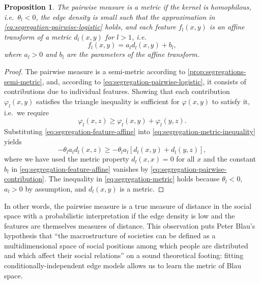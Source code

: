 \documentclass{scrartcl}
\newtheorem{prop}{Proposition}
\begin{document}
\begin{prop}
    The pairwise measure is a metric if the kernel is homophilous, i.e.\ $\theta_l<0$, the edge density is small such that the approximation in \cref{eq:segregation-pairwise-logistic} holds, and each feature $f_l(x, y)$ is an affine transform of a metric $d_l(x, y)$ for $l>1$, i.e.
    \begin{equation}
        f_l(x, y) = a_l d_l(x, y) + b_l,\label{eq:segregation-feature-affine}
    \end{equation}
    where $a_l > 0$ and $b_l$ are the parameters of the affine transform.
\end{prop}
\begin{proof}
    The pairwise measure is a semi-metric according to \cref{prop:segregations-semi-metric}, and, according to \cref{eq:segregation-pairwise-logistic}, it consists of contributions due to individual features. Showing that each contribution $\varphi_l(x, y)$ satisfies the triangle inequality is sufficient for $\varphi(x, y)$ to satisfy it, i.e.\ we require
    \begin{equation}
        \varphi_l(x, z) \geq \varphi_l(x, y) + \varphi_l(y, z).\label{eq:segregation-metric-inequality}
    \end{equation}
    Substituting \cref{eq:segregation-feature-affine} into \cref{eq:segregation-metric-inequality} yields
    \begin{equation}
        -\theta_l a_l d_l(x, z)\geq -\theta_l a_l\left[d_l(x, y) + d_l(y, z)\right],\label{eq:segregation-metric}
    \end{equation}
    where we have used the metric property $d_l(x, x) = 0$ for all $x$ and the constant $b_l$ in \cref{eq:segregation-feature-affine} vanishes by \cref{eq:segregation-pairwise-contribution}. The inequality in \cref{eq:segregation-metric} holds because $\theta_l<0$, $a_l>0$ by assumption, and $d_l(x, y)$ is a metric.
\end{proof}

In other words, the pairwise measure is a true measure of distance in the social space with a probabilistic interpretation if the edge density is low and the features are themselves measures of distance.
This observation puts Peter Blau's~\cite{Blau1977} hypothesis that ``the macrostructure of societies can be defined as a multidimensional space of social positions among which people are distributed and which affect their social relations'' on a sound theoretical footing: fitting conditionally-independent edge models allows us to learn the metric of Blau space.
\end{document}

